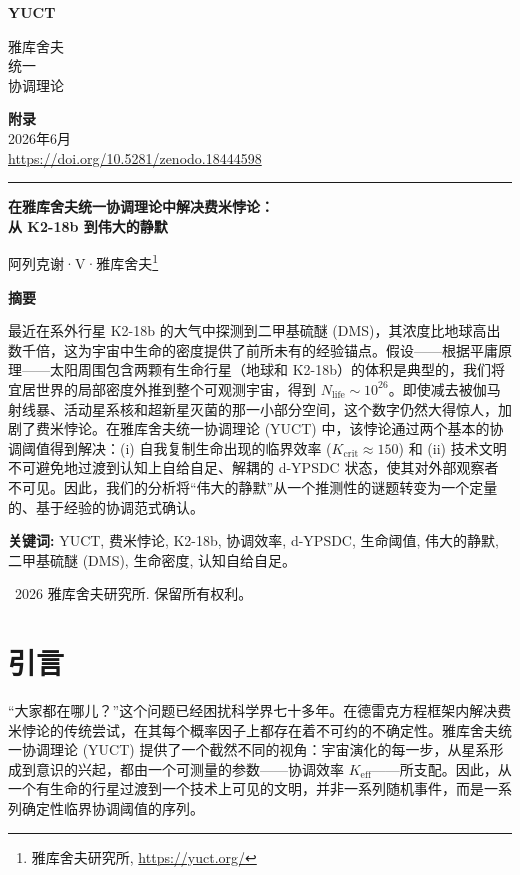 \documentclass[11pt,a4paper]{article}
\newcommand{\Keff}{K_{\mathrm{eff}}}
\newcommand{\makeheader}{%
	\noindent
	\begin{minipage}{0.17\textwidth}
		\raggedright
		{\sffamily\bfseries\color{skyblue}\fontsize{46}{46}\selectfont YUCT}%
	\end{minipage}%
	\hspace{30pt}
	\begin{minipage}{0.32\textwidth}
		\raggedright
		{\sffamily\fontsize{11}{13}\selectfont 雅库舍夫\\ 统一\\ 协调理论}%
	\end{minipage}%
	\hfill
	\begin{minipage}{0.38\textwidth}
		\raggedleft
		{\sffamily\bfseries 附录}\\
		{\sffamily 2026年6月}\\
		{\sffamily\footnotesize \url{https://doi.org/10.5281/zenodo.18444598}}%
	\end{minipage}
	\par\vspace{5pt}
	\noindent\textcolor{gold}{\rule{\textwidth}{1.6pt}}
	\par\vspace{0pt}
}
\begin{document}
	\renewcommand{\thepage}{\arabic{page}}
	\thispagestyle{firstpage}
	\makeheader
	
	\vspace{0cm}
	{\LARGE\bfseries 在雅库舍夫统一协调理论中解决费米悖论：\\ 从 K2-18b 到伟大的静默 \par}
	\vspace{0.2cm}
	
	{\large 阿列克谢·V·雅库舍夫\footnote{雅库舍夫研究所, \url{https://yuct.org/}}} \\
	\vspace{0.0cm}
	
	{\color{darkblue}\textbf{\LARGE 摘要}} \par
	{\large
		\noindent
		最近在系外行星 K2-18b 的大气中探测到二甲基硫醚 (DMS)，其浓度比地球高出数千倍，这为宇宙中生命的密度提供了前所未有的经验锚点。假设——根据平庸原理——太阳周围包含两颗有生命行星（地球和 K2-18b）的体积是典型的，我们将宜居世界的局部密度外推到整个可观测宇宙，得到 \(N_{\mathrm{life}} \sim 10^{26}\)。即使减去被伽马射线暴、活动星系核和超新星灭菌的那一小部分空间，这个数字仍然大得惊人，加剧了费米悖论。在雅库舍夫统一协调理论 (YUCT) 中，该悖论通过两个基本的协调阈值得到解决：(i) 自我复制生命出现的临界效率 (\(K_{\mathrm{crit}}\approx150\)) 和 (ii) 技术文明不可避免地过渡到认知上自给自足、解耦的 d-YPSDC 状态，使其对外部观察者不可见。因此，我们的分析将“伟大的静默”从一个推测性的谜题转变为一个定量的、基于经验的协调范式确认。
	}
	
	\vspace{0.1cm}
	\noindent
	{\color{darkblue}\textbf{关键词:}} YUCT, 费米悖论, K2-18b, 协调效率, d-YPSDC, 生命阈值, 伟大的静默, 二甲基硫醚 (DMS), 生命密度, 认知自给自足。
	
	\vspace{0.5cm}
	\noindent
	\textcopyright\ 2026 雅库舍夫研究所. 保留所有权利。
	
	\tableofcontents
	\newpage
	
	\section{引言}
	\label{sec:intro}
	
	“大家都在哪儿？”这个问题已经困扰科学界七十多年。在德雷克方程框架内解决费米悖论的传统尝试，在其每个概率因子上都存在着不可约的不确定性。雅库舍夫统一协调理论 (YUCT) 提供了一个截然不同的视角：宇宙演化的每一步，从星系形成到意识的兴起，都由一个可测量的参数——协调效率 \(\Keff\)——所支配。因此，从一个有生命的行星过渡到一个技术上可见的文明，并非一系列随机事件，而是一系列确定性临界协调阈值的序列。
	
\end{document}
